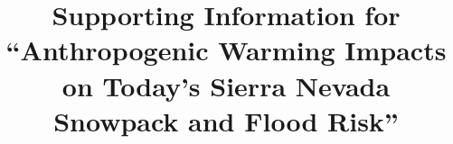 \documentclass[draft,grl]{agutexSI}
\begin{document}
%
%




\title{Supporting Information for ``Anthropogenic Warming Impacts on Today's Sierra Nevada Snowpack and Flood Risk''}

%
%

%
\end{document}
